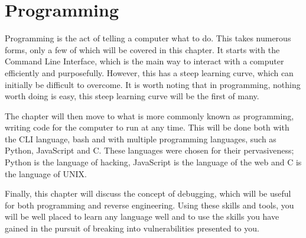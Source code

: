 \chapter{Programming}\label{ch:Programming}
	Programming is the act of telling a computer what to do.
	This takes numerous forms, only a few of which will be covered in this chapter.
	It starts with the Command Line Interface, which is the main way to interact with a computer efficiently and purposefully.
	However, this has a steep learning curve, which can initially be difficult to overcome.
	It is worth noting that in programming, nothing worth doing is easy, this steep learning curve will be the first of many.

	The chapter will then move to what is more commonly known as programming, writing code for the computer to run at any time.
	This will be done both with the CLI language, bash and with multiple programming languages, such as Python, JavaScript and C.
	These languages were chosen for their pervasiveness; Python is the language of hacking, JavaScript is the language of the web and C is the language of UNIX.

	Finally, this chapter will discuss the concept of debugging, which will be useful for both programming and reverse engineering.
	Using these skills and tools, you will be well placed to learn any language well and to use the skills you have gained in the pursuit of breaking into vulnerabilities presented to you.

